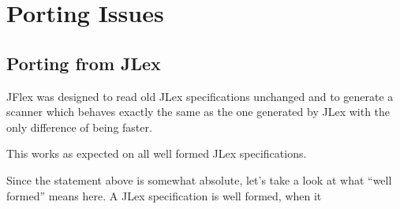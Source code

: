 \documentclass[11pt]{scrartcl}
\begin{document}
\section{Porting Issues}

\subsection{Porting from JLex}\label{Porting}
JFlex was designed to read old JLex specifications unchanged and to
generate a scanner which behaves exactly the same as the one generated
by JLex with the only difference of being faster.

This works as expected on all well formed JLex specifications.

Since the statement above is somewhat absolute, let's take a look at
what ``well formed'' means here. A JLex specification is well formed, when
it
\end{document}
